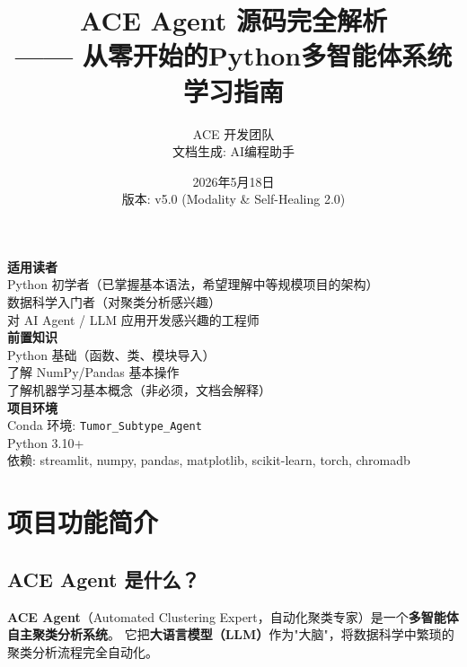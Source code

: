 \documentclass[11pt,a4paper]{ctexbook}
\title{\textbf{ACE Agent 源码完全解析}\\ —— 从零开始的Python多智能体系统学习指南}
\author{ACE 开发团队 \\ 文档生成: AI编程助手}
\date{2026年5月18日 \\ 版本: v5.0 (Modality \& Self-Healing 2.0)}
\begin{document}
\maketitle

\thispagestyle{empty}
\begin{center}
    \vspace{4cm}
    \Large\textbf{适用读者}\\[0.5cm]
    \normalsize
    Python 初学者（已掌握基本语法，希望理解中等规模项目的架构）\\
    数据科学入门者（对聚类分析感兴趣）\\
    对 AI Agent / LLM 应用开发感兴趣的工程师\\[2cm]

    \textbf{前置知识}\\[0.5cm]
    Python 基础（函数、类、模块导入）\\
    了解 NumPy/Pandas 基本操作\\
    了解机器学习基本概念（非必须，文档会解释）\\[2cm]

    \textbf{项目环境}\\[0.5cm]
    Conda 环境: \texttt{Tumor\_Subtype\_Agent}\\
    Python 3.10+\\
    依赖: streamlit, numpy, pandas, matplotlib, scikit-learn, torch, chromadb
\end{center}

\newpage
\tableofcontents
\newpage

\chapter{项目功能简介}

\section{ACE Agent 是什么？}

\textbf{ACE Agent}（Automated Clustering Expert，自动化聚类专家）是一个\textbf{多智能体自主聚类分析系统}。
它把\textbf{大语言模型（LLM）}作为"大脑"，将数据科学中繁琐的聚类分析流程完全自动化。
\end{document}

